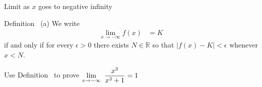 

\begin{frame}[t]{Limit as $x$ goes to negative infinity}
\AnswerSpace
{}
\begin{block}{Definition~ (a)}
We write
\begin{align*}
  \lim_{x \to -\infty} f(x) &= K
\end{align*}
if and only if for every $\epsilon>0$ there exists $N \in \mathbb{R}$ so that
$|f(x)-K| < \epsilon$ whenever $x<N$.
\end{block}\pause
\textcolor{C1}{Use Definition~ to prove $\displaystyle\lim_{x \to -\infty}~\frac{x^3}{x^3+1}=1$}
\end{frame}
